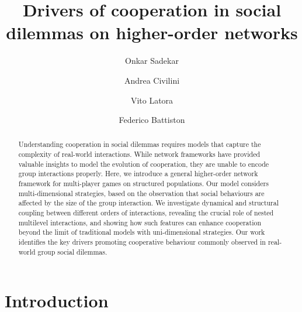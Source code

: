 \documentclass[a4paper,pre,reqno,superscriptaddress,twocolumn, floatfix]{revtex4}
\begin{document}
 
\title{Drivers of cooperation in social dilemmas on higher-order networks}


\author{Onkar Sadekar}


\author{Andrea Civilini}


\author{Vito Latora}


\author{Federico Battiston}



\begin{abstract}
Understanding cooperation in social dilemmas requires models that capture the complexity of real-world interactions.
%
While network frameworks have provided valuable insights to model the evolution of cooperation, they are unable to encode group interactions properly. 
%
Here, we introduce a general higher-order network framework for multi-player games on structured populations. 
%
Our model considers multi-dimensional strategies, based on the observation that social behaviours are affected by the size of the group interaction. 
%
We investigate dynamical and structural coupling between different orders of interactions, revealing the crucial role of nested multilevel interactions, and showing how such features can enhance cooperation beyond the limit of traditional models with uni-dimensional strategies.
%
Our work identifies the key drivers promoting cooperative behaviour commonly observed in real-world group social dilemmas.
\end{abstract}



\maketitle

\section{Introduction}
\end{document}
